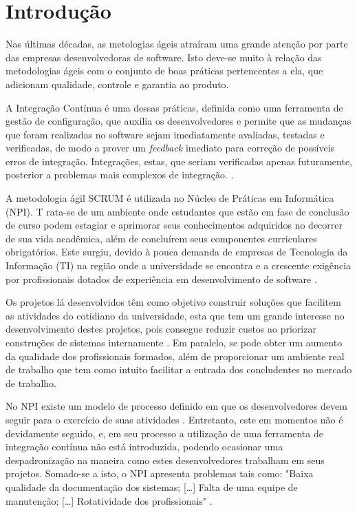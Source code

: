 \chapter{Introdução}

Nas últimas décadas, as metologias ágeis atraíram uma grande atenção por parte das empresas desenvolvedoras de software. Isto deve-se muito à relação das metodologias ágeis com o conjunto de boas práticas pertencentes a ela, que adicionam qualidade, controle e garantia ao produto.


A Integração Contínua é uma dessas práticas, definida como uma ferramenta de gestão de configuração, que auxilia os desenvolvedores e permite que as mudanças que foram realizadas no software sejam imediatamente avaliadas, testadas e verificadas, de modo a prover um \textit{feedback} imediato para correção de possíveis erros de integração. Integrações, estas, que seriam verificadas apenas futuramente, posterior a problemas mais complexos de integração. \cite{paul2007}.

A metodologia ágil SCRUM é utilizada no Núcleo de Práticas em Informática (NPI). T	rata-se de um ambiente onde estudantes que estão em fase de conclusão de curso podem estagiar e aprimorar seus conhecimentos adquiridos no decorrer de sua vida acadêmica, além de concluírem seus componentes curriculares obrigatórios. Este surgiu, devido à pouca demanda de empresas de Tecnologia da Informação (TI) na região onde a universidade se encontra e a crescente exigência por profissionais dotados de experiência em desenvolvimento de software \cite{npi2013}.

Os projetos lá desenvolvidos têm como objetivo construir soluções que facilitem as atividades do cotidiano da universidade, esta que tem um grande interesse no desenvolvimento destes projetos, pois consegue reduzir custos ao priorizar construções de sistemas internamente \cite{npi2013}. Em paralelo, se pode obter um aumento da qualidade dos profissionais formados, além de proporcionar um ambiente real de trabalho que tem como intuito facilitar a entrada dos concludentes no mercado de trabalho.

No NPI existe um modelo de processo definido em que os desenvolvedores devem seguir para o exercício de suas atividades \cite{npi2013}. Entretanto, este em momentos não é devidamente seguido, e, em seu processo a utilização de uma ferramenta de integração contínua não está introduzida, podendo ocasionar uma despadronização na maneira como estes  desenvolvedores trabalham em seus projetos. Somado-se a isto, o NPI apresenta problemas tais como: "Baixa qualidade da documentação dos sistemas; [\ldots] Falta de uma equipe de manutenção; [\ldots] Rotatividade dos profissionais" \cite[p.~4]{paduelli2006}.

